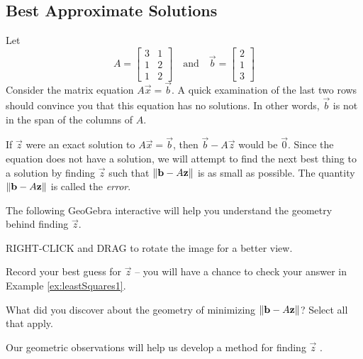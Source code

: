 \documentclass{ximera}
\begin{document}
\subsection*{Best Approximate Solutions}
\begin{exploration}\label{exp:leastSq1}
    Let
    $$A=\begin{bmatrix}3 & 1\\1 & 2\\1 & 2\end{bmatrix}\quad\text{and}\quad \vec{b}=\begin{bmatrix}2\\1\\3\end{bmatrix}$$
    Consider the matrix equation $A\vec{x}=\vec{b}$.
    A quick examination of the last two rows should convince you that this equation has no solutions.  In other words, $\vec{b}$ is not in the span of the columns of $A$.

    If $\vec{z}$ were an exact solution to $A\vec{x}=\vec{b}$, then $\vec{b}-A\vec{z}$ would be $\vec{0}$.  Since the equation does not have a solution, we will attempt to find the next best thing to a solution by finding $\vec{z}$ such that $\left\lVert\mathbf{b}-A\mathbf{z}\right\rVert$ is as small as possible.  The quantity $\left\lVert\mathbf{b}-A\mathbf{z}\right\rVert$ is called the \emph{error}.

    The following GeoGebra interactive will help you understand the geometry behind finding $\vec{z}$.  
    
    RIGHT-CLICK and DRAG to rotate the image for a better view.


\begin{onlineOnly}
\begin{center}
\end{center}
\end{onlineOnly}

 Record your best guess for $\vec{z}$ -- you will have a chance to check your answer in Example \ref{ex:leastSquares1}.

What did you discover about the geometry of minimizing $\left\lVert\mathbf{b}-A\mathbf{z}\right\rVert$? 
Select all that apply.

\begin{selectAll}
\end{selectAll}

Our geometric observations will help us develop a method for finding $\vec{z}$ .  
\end{exploration}
\end{document}
